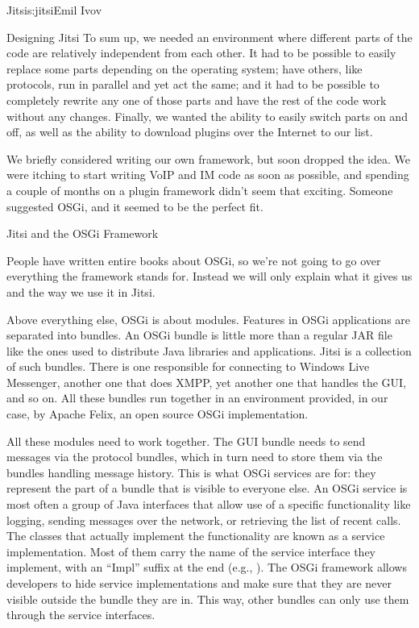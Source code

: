 \begin{aosachapter}{Jitsi}{s:jitsi}{Emil Ivov}
\begin{aosasect1}{Designing Jitsi}
To sum up, we needed an environment where different parts of the code
are relatively independent from each other. It had to be possible to
easily replace some parts depending on the operating system; have
others, like protocols, run in parallel and yet act the same; and it
had to be possible to completely rewrite any one of those parts and
have the rest of the code work without any changes.  Finally, we
wanted the ability to easily switch parts on and off, as well as the
ability to download plugins over the Internet to our list.

We briefly considered writing our own framework, but soon dropped the
idea. We were itching to start writing VoIP and IM code as soon as
possible, and spending a couple of months on a plugin framework
didn't seem that exciting. Someone suggested OSGi, and it seemed to be
the perfect fit.

\end{aosasect1}

\begin{aosasect1}{Jitsi and the OSGi Framework}

People have written entire books about OSGi, so we're not going to go
over everything the framework stands for. Instead we will only explain
what it gives us and the way we use it in Jitsi.

Above everything else, OSGi is about modules.  Features in OSGi
applications are separated into bundles. An OSGi bundle is little more
than a regular JAR file like the ones used to distribute Java
libraries and applications. Jitsi is a collection of such
bundles. There is one responsible for connecting to Windows Live
Messenger, another one that does XMPP, yet another one that handles
the GUI, and so on.  All these bundles run together in an environment
provided, in our case, by Apache Felix, an open source OSGi
implementation.

All these modules need to work together. The GUI bundle needs to send
messages via the protocol bundles, which in turn need to store them
via the bundles handling message history. This is what OSGi services
are for: they represent the part of a bundle that is visible to
everyone else. An OSGi service is most often a group of Java
interfaces that allow use of a specific functionality like logging,
sending messages over the network, or retrieving the list of recent
calls. The classes that actually implement the functionality are known
as a service implementation. Most of them carry the name of the
service interface they implement, with an ``Impl'' suffix at the end
(e.g., ). The OSGi framework allows
developers to hide service implementations and make sure that they are
never visible outside the bundle they are in. This way, other bundles
can only use them through the service interfaces.


\end{aosasect1}
\end{aosachapter}
